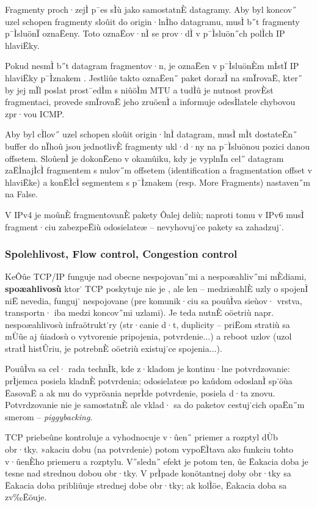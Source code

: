 Fragmenty proch·zejÌ p¯es sÌù jako samostatnÈ datagramy. Aby byl koncov˝ uzel schopen fragmenty sloûit do origin·lnÌho datagramu, musÌ b˝t fragmenty p¯ÌsluönÏ oznaËeny. Toto oznaËov·nÌ se prov·dÌ v p¯Ìsluön˝ch polÌch IP hlaviËky.

Pokud nesmÌ b˝t datagram fragmentov·n, je oznaËen v p¯ÌsluönÈm mÌstÏ IP hlaviËky p¯Ìznakem . Jestliûe takto oznaËen˝ paket dorazÌ na smÏrovaË, kter˝ by jej mÏl poslat prost¯edÌm s niûöÌm MTU a tudÌû je nutnost provÈst fragmentaci, provede smÏrovaË jeho zruöenÌ a informuje odesÌlatele chybovou zpr·vou ICMP. 

Aby byl cÌlov˝ uzel schopen sloûit origin·lnÌ datagram, musÌ mÌt dostateËn˝ buffer do nÏhoû jsou jednotlivÈ fragmenty ukl·d·ny na p¯Ìsluönou pozici danou offsetem. SloûenÌ je dokonËeno v okamûiku, kdy je vyplnÏn cel˝ datagram zaËÌnajÌcÌ fragmentem s nulov˝m offsetem (identification a fragmentation offset v hlaviËke) a konËÌcÌ segmentem s p¯Ìznakem  (resp. More Fragments) nastaven˝m na False.

V IPv4 je moûnÈ fragmentovanÈ pakety Ôalej deliù; naproti tomu v IPv6 musÌ fragment·ciu zabezpeËiù odosielateæ -- nevyhovuj˙ce pakety sa zahadzuj˙.


\subsubsection*{Spolehlivost, Flow control, Congestion control}
KeÔûe TCP/IP funguje nad obecne nespojovan˝mi a nespoæahliv˝mi mÈdiami, \textbf{spoæahlivosù} ktor˙ TCP poskytuje nie je , ale len  -- medziæahlÈ uzly o spojenÌ niË nevedia, funguj˙ nespojovane (pre komunik·ciu sa pouûÌva sieùov· vrstva, transportn·  iba medzi koncov˝mi uzlami). Je teda nutnÈ oöetriù napr. nespoæahlivosù infraötrukt˙ry (str·canie d·t, duplicity -- priËom stratiù sa mÙûe aj ûiadosù o vytvorenie pripojenia, potvrdenie...) a reboot uzlov (uzol stratÌ histÛriu, je potrebnÈ oöetriù existuj˙ce spojenia...).

PouûÌva sa cel· rada technÌk, kde z·kladom je kontinu·lne potvrdzovanie: prÌjemca posiela kladnÈ potvrdenia; odosielateæ po kaûdom odoslanÌ sp˙öùa ËasovaË a ak mu do vypröania neprÌde potvrdenie, posiela d·ta znovu.  Potvrdzovanie nie je samostatnÈ ale vklad· sa do paketov cestuj˙cich opaËn˝m smerom -- \emph{piggybacking}.

TCP priebeûne kontroluje  a vyhodnocuje v·ûen˝ priemer a rozptyl dÙb obr·tky. »akaciu dobu (na potvrdenie) potom vypoËÌtava ako funkciu tohto v·ûenÈho priemeru a rozptylu. V˝sledn˝ efekt je potom ten, ûe Ëakacia doba je tesne nad strednou dobou obr·tky. V prÌpade konötantnej doby obr·tky sa Ëakacia doba pribliûuje strednej dobe obr·tky; ak kolÌöe, Ëakacia doba sa zv‰Ëöuje.

